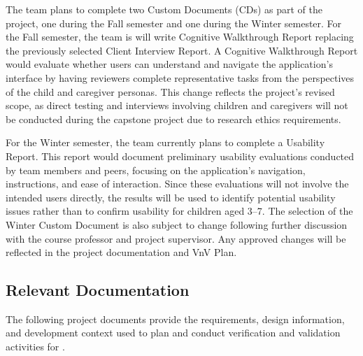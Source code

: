 \documentclass[10pt,titlepage]{article}
\begin{document}
The team plans to complete two Custom Documents (CDs) as part of the \progname{} project, one during the Fall semester and one during
the Winter semester. For the Fall semester, the team is will write Cognitive Walkthrough Report replacing the previously selected 
Client Interview Report. A Cognitive Walkthrough Report would evaluate whether users can understand and navigate the application's 
interface by having reviewers complete representative tasks from the perspectives of the child and caregiver personas. This change 
reflects the project's revised scope, as direct testing and interviews involving children and caregivers will not be conducted during 
the capstone project due to research ethics requirements.

For the Winter semester, the team currently plans to complete a Usability Report. This report would document preliminary
usability evaluations conducted by team members and peers, focusing on the application's navigation, instructions, and
ease of interaction. Since these evaluations will not involve the intended users directly, the results will be used to
identify potential usability issues rather than to confirm usability for children aged 3--7. The selection of the Winter 
Custom Document is also subject to change following further discussion with the course professor and project supervisor. 
Any approved changes will be reflected in the project documentation and VnV Plan.

\subsection{Relevant Documentation}

The following project documents provide the requirements,
design information, and development context used to plan
and conduct verification and validation activities for
\progname{}.
\end{document}
